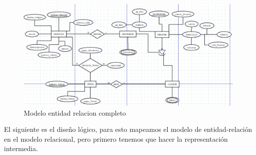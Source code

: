 \documentclass{article}
\begin{document}
\pagebreak

\setcounter{figure}{0}
\begin{figure}[h]
\caption {Modelo entidad relacion completo}
\centering
\includegraphics[width=\textwidth]{fig1}
\end{figure}

El siguiente es el diseño lógico, para esto mapeamos el modelo de entidad-relación en el modelo relacional, pero primero tenemos que hacer la representación intermedia. \\
\end{document}

